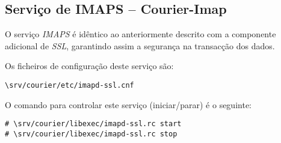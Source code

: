 \subsection{Serviço de IMAPS -- Courier-Imap}

O serviço \emph{IMAPS} é idêntico ao anteriormente descrito com a componente adicional de \emph{SSL}, garantindo assim a segurança na transacção dos dados.


Os ficheiros de configuração deste serviço são:

\begin{Verbatim}[commandchars=\\\{\}]
\srv/courier/etc/imapd-ssl.cnf
\end{Verbatim}

O comando para controlar este serviço (iniciar/parar) é o seguinte:

\begin{Verbatim}[commandchars=\\\{\}]
# \srv/courier/libexec/imapd-ssl.rc start
# \srv/courier/libexec/imapd-ssl.rc stop
\end{Verbatim}
